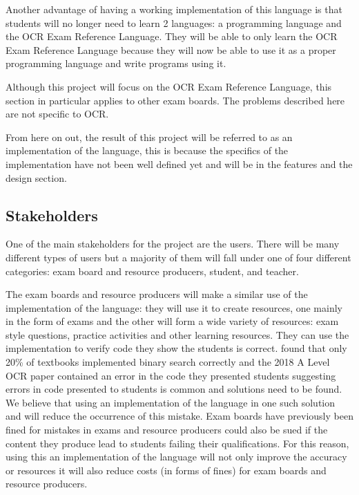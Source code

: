 \documentclass{article}
\begin{document}
Another advantage of having a working implementation of this language is that
students will no longer need to learn 2 languages: a programming language and
the OCR Exam Reference Language. They will be able to only learn the OCR Exam
Reference Language because they will now be able to use it as a proper
programming language and write programs using it.

Although this project will focus on the OCR Exam Reference Language, this
section in particular applies to other exam boards. The problems described here
are not specific to OCR.


From here on out, the result of this project will be referred to as an
implementation of the language, this is because the specifics of the
implementation have not been well defined yet and will be in the features and
the design section.

\subsection{Stakeholders}

One of the main stakeholders for the project are the users. There will be
many different types of users but a majority of them will fall under one of
four different categories: exam board and resource producers, student, and
teacher.

The exam boards and resource producers will make a similar use of the
implementation of the language: they will use it to create resources, one
mainly in the form of exams and the other will form a wide variety of
resources: exam style questions, practice activities and other learning
resources. They can use the implementation to verify code they show the
students is correct. \Textcite{pattis88} found that only 20\% of textbooks
implemented binary search correctly and the 2018 A Level OCR paper contained an
error in the code they presented students suggesting errors in code presented
to students is common and solutions need to be found. We believe that using
an implementation of the language in one such solution and will reduce the
occurrence of this mistake. Exam boards have previously been fined for mistakes
in exams \cite{ofqual20180702} and resource producers could also be sued if the
content they produce lead to students failing their qualifications. For this
reason, using this an implementation of the language will not only improve the
accuracy or resources it will also reduce costs (in forms of fines) for exam
boards and resource producers.
\end{document}
